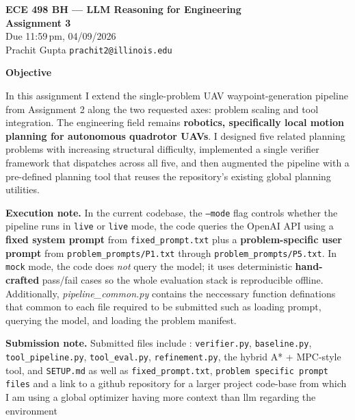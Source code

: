 \documentclass[12pt]{article}
\begin{document}
\begin{center}
  {\LARGE\textbf{ECE 498 BH --- LLM Reasoning for Engineering}}\\[6pt]
  {\large\textbf{Assignment 3}}\\[4pt]
  {\normalsize Due 11:59\,pm, 04/09/2026}\\[10pt]
  {\large Prachit Gupta \quad \texttt{prachit2@illinois.edu}}
\end{center}
\thispagestyle{fancy}

\bigskip
\noindent\textbf{Objective}

\noindent
In this assignment I extend the single-problem UAV waypoint-generation pipeline from Assignment 2
along the two requested axes: problem scaling and tool integration. The engineering field remains
\textbf{robotics, specifically local motion planning for autonomous quadrotor UAVs}. I designed
five related planning problems with increasing structural difficulty, implemented a single verifier
framework that dispatches across all five, and then augmented the pipeline with a pre-defined
planning tool that reuses the repository's existing global planning utilities.

\medskip
\noindent\textbf{Execution note.}
In the current codebase, the \texttt{--mode} flag controls whether the pipeline runs in \texttt{live} or
\texttt{live} mode, the code queries the OpenAI API using a \textbf{fixed system prompt} from
\texttt{fixed\_prompt.txt} plus a \textbf{problem-specific user prompt} from
\texttt{problem\_prompts/P1.txt} through \texttt{problem\_prompts/P5.txt}. In \texttt{mock}
mode, the code does \emph{not} query the model; it uses deterministic \textbf{hand-crafted} pass/fail cases
so the whole evaluation stack is reproducible offline.  Additionally, \textit{pipeline\_common.py} contains the neccessary function definations that common to each file required to be submitted such as loading prompt, querying the model, and loading the problem manifest.\newline

\noindent\textbf{Submission note.}
Submitted files include :
\texttt{verifier.py}, \texttt{baseline.py}, \texttt{tool\_pipeline.py},
\texttt{tool\_eval.py}, \texttt{refinement.py}, the hybrid A* + MPC-style tool, and
\texttt{SETUP.md} as well as \texttt{fixed\_prompt.txt}, \texttt{problem specific prompt files} and a link to a github repository for a larger project code-base from which I am using a global optimizer having more context than llm regarding the environment
\end{document}
